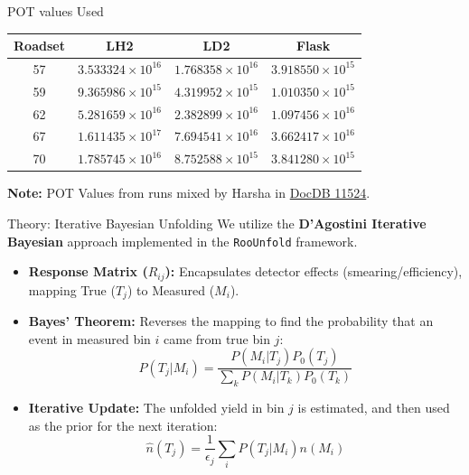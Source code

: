\documentclass[aspectratio=169]{beamer}
\begin{document}
\begin{frame}{POT values Used}
\begin{table}
    \centering
    \renewcommand{\arraystretch}{1.3}
    \begin{tabular}{|c|c|c|c|}
        \hline
        \textbf{Roadset} & \textbf{LH2} & \textbf{LD2} & \textbf{Flask} \\ \hline
        57 & $3.533324 \times 10^{16}$ & $1.768358 \times 10^{16}$ & $3.918550 \times 10^{15}$ \\ \hline
        59 & $9.365986 \times 10^{15}$ & $4.319952 \times 10^{15}$ & $1.010350 \times 10^{15}$ \\ \hline
        62 & $5.281659 \times 10^{16}$ & $2.382899 \times 10^{16}$ & $1.097456 \times 10^{16}$ \\ \hline
        67 & $1.611435 \times 10^{17}$ & $7.694541 \times 10^{16}$ & $3.662417 \times 10^{16}$ \\ \hline
        70 & $1.785745 \times 10^{16}$ & $8.752588 \times 10^{15}$ & $3.841280 \times 10^{15}$ \\ \hline
    \end{tabular}
\end{table}
\vspace{0.3cm}
\footnotesize
\textbf{Note:} POT Values from runs mixed by Harsha in \href{https://seaquest-docdb.fnal.gov/cgi-bin/sso/ShowDocument?docid=11524}{DocDB 11524}.
\normalsize
\end{frame}

\begin{frame}{Theory: Iterative Bayesian Unfolding}
    We utilize the \textbf{D'Agostini Iterative Bayesian} approach implemented in the \texttt{RooUnfold} framework.
    \begin{itemize}
        \item \textbf{Response Matrix ($R_{ij}$):} Encapsulates detector effects (smearing/efficiency), mapping True ($T_j$) to Measured ($M_i$).
        \item \textbf{Bayes' Theorem:} Reverses the mapping to find the probability that an event in measured bin $i$ came from true bin $j$:
        \[ P(T_j | M_i) = \frac{P(M_i | T_j) P_0(T_j)}{\sum_{k} P(M_i | T_k) P_0(T_k)} \]
        \item \textbf{Iterative Update:} The unfolded yield in bin $j$ is estimated, and then used as the prior for the next iteration:
        \[ \hat{n}(T_j) = \frac{1}{\epsilon_j} \sum_{i} P(T_j | M_i) n(M_i) \]
    \end{itemize}
\end{frame}
\end{document}

